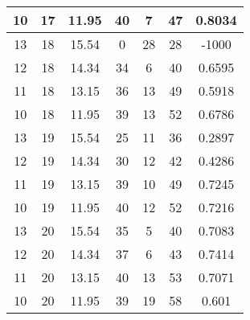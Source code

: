 \documentclass[letterpaper, 12pt]{article}
\begin{document}
\begin{longtable}{|c|c|c|c|c|c|c|}
10 & 17 & 11.95 & 40 & 7 & 47 & 0.8034 \\
\hline
13 & 18 & 15.54 & 0 & 28 & 28 & -1000 \\
\hline
12 & 18 & 14.34 & 34 & 6 & 40 & 0.6595 \\
\hline
11 & 18 & 13.15 & 36 & 13 & 49 & 0.5918 \\
\hline
10 & 18 & 11.95 & 39 & 13 & 52 & 0.6786 \\
\hline
13 & 19 & 15.54 & 25 & 11 & 36 & 0.2897 \\
\hline
12 & 19 & 14.34 & 30 & 12 & 42 & 0.4286 \\
\hline
11 & 19 & 13.15 & 39 & 10 & 49 & 0.7245 \\
\hline
10 & 19 & 11.95 & 40 & 12 & 52 & 0.7216 \\
\hline
13 & 20 & 15.54 & 35 & 5 & 40 & 0.7083 \\
\hline
12 & 20 & 14.34 & 37 & 6 & 43 & 0.7414 \\
\hline
11 & 20 & 13.15 & 40 & 13 & 53 & 0.7071 \\
\hline
10 & 20 & 11.95 & 39 & 19 & 58 & 0.601 \\
\hline
\end{longtable}
\end{document}
